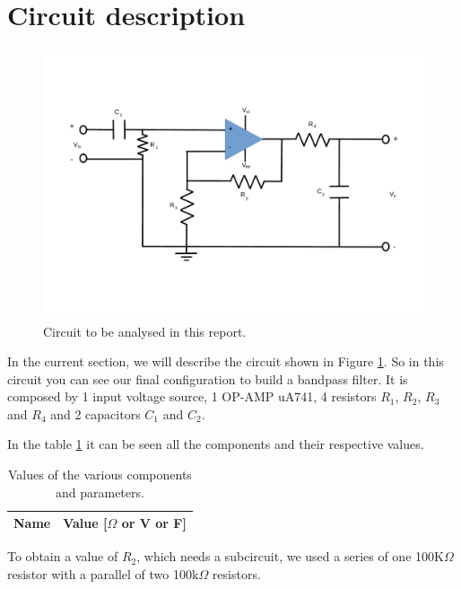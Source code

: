 \section{Circuit description}
\label{sec:analysis}

\begin{figure}[h] \centering
\includegraphics[width=0.9\linewidth]{../figlib/t5.pdf}
\caption{Circuit to be analysed in this report.}
\label{fig:lab4}
\end{figure}


\par In the current section, we will describe the circuit shown in Figure \ref{fig:lab4}. 
So in this circuit you can see our final configuration to build a bandpass filter. It is composed by 1 input voltage source, 1 OP-AMP uA741, 4 resistors $R_{1}$, $R_{2}$,
$R_{3}$ and $R_{4}$ and 2 capacitors $C_{1}$ and $C_{2}$.
\par In the table \ref{tab:circuit_values} it can be seen all the components and their respective values.


\begin{table}[h]
  \centering
  \begin{tabular}{|l|r|}
    \hline    
    {\bf Name} & {\bf Value [{$\Omega$} or V or F]} \\ \hline
    
  \end{tabular}
  \caption{Values of the various components and parameters.}
  \label{tab:circuit_values}
\end{table}

To obtain a value of $R_{2}$, which needs a subcircuit, we used a series of one 100K$\Omega$ resistor with a parallel of two 100k$\Omega$ resistors. 

